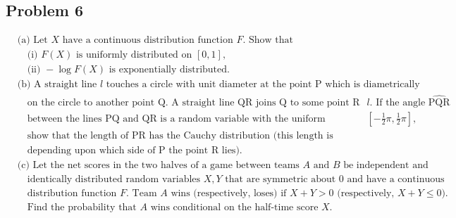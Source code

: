\documentclass[letterpaper, 11pt]{article}
\newcommand{\1}{\mathds{1}}	%
\theoremstyle{definition}
\begin{document}
    \subsection*{Problem 6}
    \begin{align*}
        &\text{(a) Let } X \text{ have a continuous distribution function } F. \text{ Show that}\\
        &\quad \text{(i) } F(X) \text{ is uniformly distributed on } [0, 1],\\
        &\quad \text{(ii) } -\log F(X) \text{ is exponentially distributed.}\\
        &\text{(b) A straight line } l \text{ touches a circle with unit diameter at the point P which is diametrically opposed}\\
        &\quad \text{on the circle to another point Q. A straight line QR joins Q to some point R on } l. \text{ If the angle } \widehat{\text{PQR}}\\
        &\quad \text{between the lines PQ and QR is a random variable with the uniform distribution on } [-\frac{1}{2}\pi, \frac{1}{2}\pi],\\
        &\quad \text{show that the length of PR has the Cauchy distribution (this length is measured positive or negative}\\
        &\quad \text{depending upon which side of P the point R lies).}\\
        &\text{(c) Let the net scores in the two halves of a game between teams } A \text{ and } B \text{ be independent and}\\
        &\quad \text{identically distributed random variables } X, Y \text{ that are symmetric about 0 and have a continuous}\\
        &\quad \text{distribution function } F. \text{ Team } A \text{ wins (respectively, loses) if } X + Y > 0 \text{ (respectively, } X + Y \leq 0).\\
        &\quad \text{Find the probability that } A \text{ wins conditional on the half-time score } X.
        \end{align*}
\end{document}
